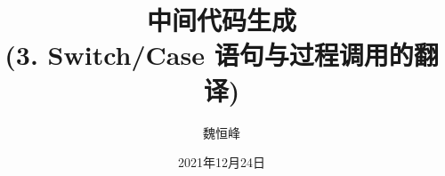 \documentclass[]{beamer}
\title[语义分析]{中间代码生成 \\ (3. Switch/Case 语句与过程调用的翻译)}
\author[魏恒峰]{\large 魏恒峰}
\institute{hfwei@nju.edu.cn}
\date{2021年12月24日}
\begin{document}
\maketitle



\thankyou{}

\end{document}
